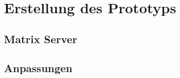 \chapter{Erstellung des Prototyps}\label{chapter:schlussbetrachtung}

\section{Matrix Server}\label{chapter:kr}

\section{Anpassungen}\label{chapter:fazit}